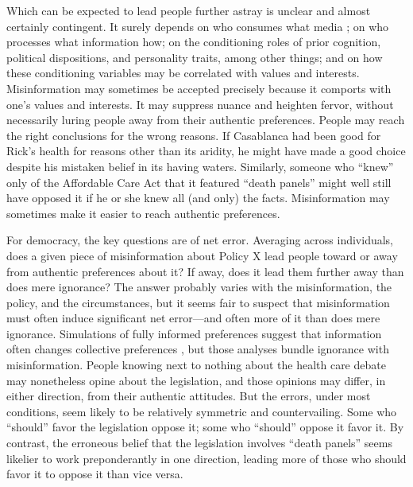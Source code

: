 \documentclass[11pt]{article}
\begin{document}
Which can be expected to lead people further astray is unclear and almost certainly contingent. It surely depends on who consumes what media \citep{iyengar2009, stroud2010}; on who processes what information how; on the conditioning roles of prior cognition, political dispositions, and personality traits, among other things; and on how these conditioning variables may be correlated with values and interests. Misinformation may sometimes be accepted precisely because it comports with one's values and interests. It may suppress nuance and heighten fervor, without necessarily luring people away from their authentic preferences. People may reach the right conclusions for the wrong reasons. If Casablanca had been good for Rick's health for reasons other than its aridity, he might have made a good choice despite his mistaken belief in its having waters. Similarly, someone who ``knew'' only of the Affordable Care Act that it featured ``death panels'' might well still have opposed it if he or she knew all (and only) the facts. Misinformation may sometimes make it easier to reach authentic preferences.

For democracy, the key questions are of net error. Averaging across individuals, does a given piece of misinformation about Policy X lead people toward or away from authentic preferences about it? If away, does it lead them further away than does mere ignorance? The answer probably varies with the misinformation, the policy, and the circumstances, but it seems fair to suspect that misinformation must often induce significant net error---and often more of it than does mere ignorance. Simulations of fully informed preferences suggest that information often changes collective preferences \citep{dellicarpini1996, althaus1998}, but those analyses bundle ignorance with misinformation. People knowing next to nothing about the health care debate may nonetheless opine about the legislation, and those opinions may differ, in either direction, from their authentic attitudes. But the errors, under most conditions, seem likely to be relatively symmetric and countervailing. Some who ``should'' favor the legislation oppose it; some who ``should'' oppose it favor it. By contrast, the erroneous belief that the legislation involves ``death panels'' seems likelier to work preponderantly in one direction, leading more of those who should favor it to oppose it than vice versa.
\end{document}
